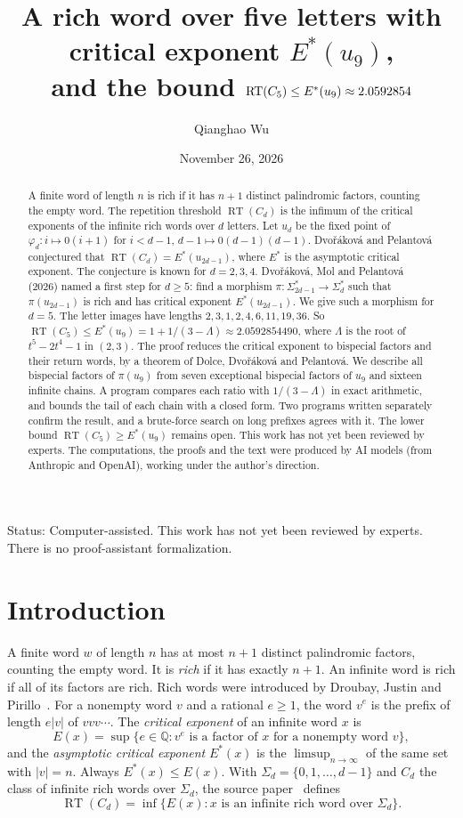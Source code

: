\documentclass[11pt]{article}
\title{A rich word over five letters with critical exponent $E^*(u_9)$,\\ and the bound $\RT(C_5)\le E^*(u_9)\approx 2.0592854$}
\author{Qianghao Wu}
\date{November 26, 2026}
\theoremstyle{remark}
\newcommand{\RT}{\operatorname{RT}}
\begin{document}
\maketitle

\begin{abstract}
A finite word of length $n$ is rich if it has $n+1$ distinct palindromic factors,
counting the empty word. The repetition threshold $\RT(C_d)$ is the infimum of the
critical exponents of the infinite rich words over $d$ letters. Let $u_d$ be the fixed
point of $\varphi_d\colon i\mapsto 0(i+1)$ for $i<d-1$, $d-1\mapsto 0(d-1)(d-1)$.
Dvořáková and Pelantová conjectured that $\RT(C_d)=E^*(u_{2d-1})$, where $E^*$ is the
asymptotic critical exponent. The conjecture is known for $d=2,3,4$. Dvořáková, Mol and
Pelantová (2026) named a first step for $d\ge5$: find a morphism
$\pi\colon\Sigma_{2d-1}^*\to\Sigma_d^*$ such that $\pi(u_{2d-1})$ is rich and has critical
exponent $E^*(u_{2d-1})$. We give such a morphism for $d=5$. The letter images have
lengths $2,3,1,2,4,6,11,19,36$. So $\RT(C_5)\le E^*(u_9)=1+1/(3-\Lambda)\approx
2.0592854490$, where $\Lambda$ is the root of $t^5-2t^4-1$ in $(2,3)$. The proof
reduces the critical exponent to bispecial factors and their return words, by a theorem
of Dolce, Dvořáková and Pelantová. We describe all bispecial factors of $\pi(u_9)$ from
seven exceptional bispecial factors of $u_9$ and sixteen infinite chains. A program compares each ratio
with $1/(3-\Lambda)$ in exact arithmetic, and bounds the tail of each chain with a
closed form. Two programs written separately confirm the result, and a brute-force search
on long prefixes agrees with it. The lower bound $\RT(C_5)\ge E^*(u_9)$ remains open.
This work has not yet been reviewed by experts. The computations, the proofs and the
text were produced by AI models (from Anthropic and OpenAI), working under the author's
direction.
\end{abstract}

\noindent Status: Computer-assisted. This work has not yet been reviewed by experts.
There is no proof-assistant formalization.

\section{Introduction}

A finite word $w$ of length $n$ has at most $n+1$ distinct palindromic factors, counting
the empty word. It is \emph{rich} if it has exactly $n+1$. An infinite word is rich if
all of its factors are rich. Rich words were introduced by Droubay, Justin and
Pirillo~\cite{djp}. For a nonempty word $v$ and a rational $e\ge1$, the word $v^e$ is the
prefix of length $e|v|$ of $vvv\cdots$. The \emph{critical exponent} of an infinite word
$x$ is
\[
E(x)=\sup\{e\in\mathbb Q : v^e \text{ is a factor of } x \text{ for a nonempty word } v\},
\]
and the \emph{asymptotic critical exponent} $E^*(x)$ is the $\limsup_{n\to\infty}$ of the
same set with $|v|=n$. Always $E^*(x)\le E(x)$. With $\Sigma_d=\{0,1,\dots,d-1\}$ and
$C_d$ the class of infinite rich words over $\Sigma_d$, the source paper~\cite{dmp}
defines
\[
\RT(C_d)=\inf\{E(x) : x \text{ is an infinite rich word over } \Sigma_d\}.
\]
\end{document}

